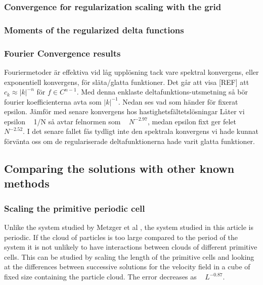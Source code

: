 \documentclass[a4paper,
twoside=false,abstract=false,numbers=noenddot,
titlepage=false,headings=small,parskip=half,version=last]{scrartcl}
\begin{document}
\subsubsection{Convergence for regularization scaling with the grid}
\subsubsection{Moments of the regularized delta functions}
\subsubsection{Fourier Convergence results}
Fouriermetoder är effektiva vid låg upplösning tack vare spektral konvergens, eller exponentiell konvergens, för släta/glatta funktioner. Det går att visa [REF] att $c_k \approx |k|^{-n}$ för $f \in C^{n-1}$.
Med denna enklaste deltafunktions-utsmetning så bör fourier koefficienterna avta som $|k|^{-1}$.
Nedan ses vad som händer för fixerat epsilon. Jämför med senare 
konvergens hos hastighetsfältetslösningar
Låter vi epsilon ~ 1/N så avtar felnormen som ~ $N^{-2.97}$, medan epsilon fixt ger felet ~ $N^{-2.52}$. I det senare fallet fås tydligt inte den spektrala konvergens vi hade kunnat förvänta oss om de regulariserade deltafunktionerna hade varit glatta funktioner.
\subsection{Comparing the solutions with other known methods}
\subsubsection{Scaling the primitive periodic cell}\label{cellscale}
Unlike the system studied by Metzger et al \cite{fallingclouds}, the system studied in this article is periodic. If the cloud of particles is too large compared to the period of the system it is not unlikely to have interactions between clouds of different primitive cells. This can be studied by scaling the length of the primitive cells and looking at the differences between successive solutions for the velocity field in a cube of fixed size containing the particle cloud. The error decreases as ~ $L^{-0.87}$.
\end{document}
